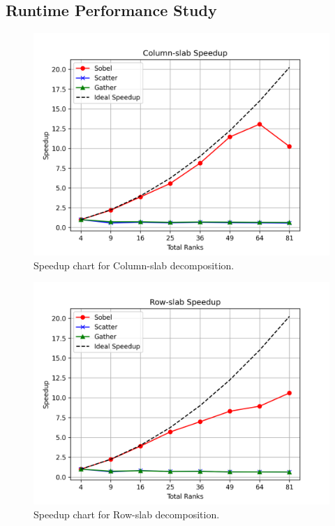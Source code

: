 \subsection{Runtime Performance Study}
\label{subsec:runtime-performance-study}
\begin{figure}[htbp]
    \centering
    \includegraphics[width=1.0\linewidth]{images/column-slab_speedup.png}
    \caption{Speedup chart for Column-slab decomposition.}
    \label{fig:speedup-column}
\end{figure}

\begin{figure}[htbp]
    \centering
    \includegraphics[width=1.0\linewidth]{images/row-slab_speedup.png}
    \caption{Speedup chart for Row-slab decomposition.}
    \label{fig:speedup-row}
\end{figure}


